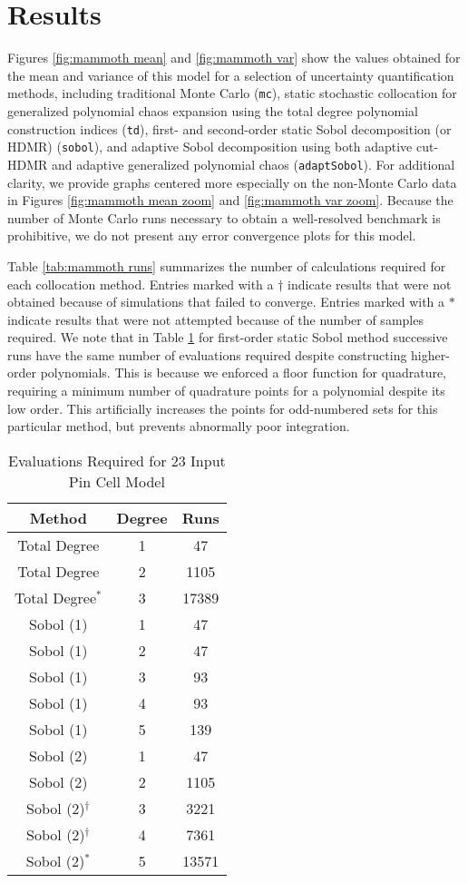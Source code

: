 \section{Results}
Figures \ref{fig:mammoth mean} and \ref{fig:mammoth var} show the values obtained for the mean and variance of
this model for a selection of uncertainty quantification methods, including
traditional Monte Carlo (\texttt{mc}),
static stochastic collocation for generalized polynomial chaos expansion using the total degree polynomial
construction indices (\texttt{td}), 
first- and second-order static Sobol decomposition (or HDMR) (\texttt{sobol}),
and adaptive Sobol decomposition using both adaptive cut-HDMR and adaptive generalized polynomial chaos
(\texttt{adaptSobol}).  For additional clarity, we provide graphs centered more especially on the non-Monte
Carlo data in Figures \ref{fig:mammoth mean zoom} and \ref{fig:mammoth var zoom}.  Because the number of Monte
Carlo runs necessary to obtain a well-resolved benchmark is prohibitive, we do not present any error
convergence plots for this model.

Table \ref{tab:mammoth
runs} summarizes the number of calculations required for each collocation method.  Entries marked with a
$\dagger$ indicate results that were not obtained because of \mammoth{} simulations that failed to converge.
Entries marked with a $*$ indicate results that were not attempted because of the number of samples required.
We note that in Table \ref{tab:mammoth} for first-order static Sobol method successive runs have the same
number of evaluations required despite constructing higher-order polynomials.  This is because we enforced a
floor function for quadrature, requiring a minimum number of quadrature points for a polynomial despite its
low order.  This
artificially increases the points for odd-numbered sets for this particular method, but prevents abnormally
poor integration.
\begin{table}
  \centering
  \begin{tabular}{c c|c}
    Method & Degree & Runs \\ \hline
    Total Degree & 1 & 47 \\
    Total Degree & 2 & 1105 \\
    Total Degree$^*$ & 3 & 17389 \\ \hline
    Sobol (1) & 1 & 47 \\
    Sobol (1) & 2 & 47 \\
    Sobol (1) & 3 & 93 \\
    Sobol (1) & 4 & 93 \\
    Sobol (1) & 5 & 139\\ \hline
    Sobol (2) & 1 & 47 \\
    Sobol (2) & 2 & 1105 \\
    Sobol (2)$^\dagger$ & 3 & 3221 \\
    Sobol (2)$^\dagger$ & 4 & 7361 \\
    Sobol (2)$^*$ & 5 & 13571 \\
  \end{tabular}
  \caption{Evaluations Required for 23 Input Pin Cell Model}
  \label{tab:mammoth}
\end{table}

